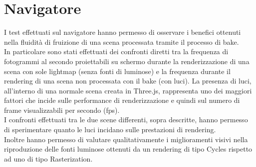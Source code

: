 \newpage
\section{Navigatore}
\label{sec:chapter_prove_sperimentali_navigator}

I test effettuati sul navigatore hanno permesso di osservare i benefici ottenuti nella fluidità di fruizione di una scena processata tramite il processo di  bake.
\\
In particolare sono stati effettuati dei confronti diretti tra la frequenza di fotogrammi al secondo proiettabili su schermo durante la renderizzazione di una scena con sole lightmap (senza fonti di luminose) e la frequenza durante il rendering di una scena non processata con il bake (con luci).
La presenza di luci, all’interno di una normale scena creata in Three.js, rappresenta uno dei maggiori fattori che incide sulle performance di renderizzazione e quindi sul numero di frame visualizzabili per secondo (fps).
\\
I confronti effettuati tra le due scene differenti, sopra descritte, hanno permesso di sperimentare quanto le luci incidano sulle prestazioni di rendering.
\\ 
Inoltre hanno permesso di valutare qualitativamente i miglioramenti visivi nella riproduzione delle fonti luminose ottenuti da un rendering di tipo Cycles rispetto ad uno di tipo Rasterization.
